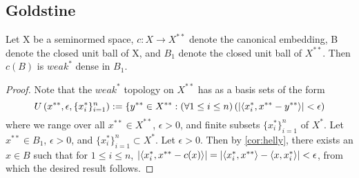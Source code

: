 \subsection{Goldstine} 
\begin{thm}[Goldstine]
    \label{thm:goldstine}
    Let X be a seminormed space, $c:X \to X^{**}$ denote the canonical embedding, B denote the closed unit ball of X, and $B_1$ denote the closed unit ball of $X^{**}$. Then $c(B)$ is $weak^*$ dense in $B_1$.   
    \begin{proof}
        Note that the $weak^*$ topology on $X^{**}$ has as a basis sets of the form
        \begin{equation}
            U\left( x^{**},\epsilon,\{x_i^*\}_{i=1}^n\right):=\{ y^{**} \in X^{**} : \left( \forall 1 \leq i \leq n\right)\left(  \left| \left\langle x_i^*,x^{**}-y^{**} \right\rangle \right| < \epsilon \right)
        \end{equation}
        where we range over all $x^{**} \in X^{**}$, $\epsilon > 0$, and finite subsets $\{x_i^*\}_{i=1}^n$ of $X^*$. 
        Let $x^{**} \in B_1$, $\epsilon > 0$, and $\{x_i^*\}_{i=1}^n \subset X^*$. 
        Let $\epsilon > 0$. Then by \ref{cor:helly}, there exists an $x \in B$ such that for $1 \leq i \leq n$, $\left| \left\langle x_i^*,x^{**}-c(x) \right\rangle \right|= \left| \left\langle x_i^*,x^{**} \right\rangle-\left\langle x,x_i^* \right\rangle \right| < \epsilon$, from which the desired result follows.
    \end{proof}
\end{thm} 
